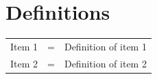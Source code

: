 
\chapter{Definitions}
\label{definitions}

\begin{longtable}{p{1.55cm} p{0.15cm} p{9.8cm}}	
Item 1 			&=& Definition of item 1 \\
Item 2 			&=& Definition of item 2 \\
\end{longtable}